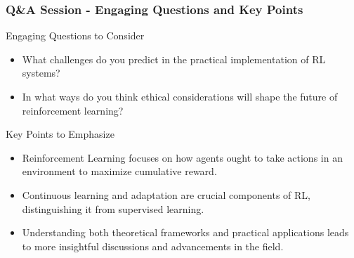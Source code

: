 \documentclass[aspectratio=169]{beamer}
\begin{document}
\begin{frame}[fragile]
    \frametitle{Q\&A Session - Engaging Questions and Key Points}
    \begin{block}{Engaging Questions to Consider}
        \begin{itemize}
            \item What challenges do you predict in the practical implementation of RL systems?
            \item In what ways do you think ethical considerations will shape the future of reinforcement learning?
        \end{itemize}
    \end{block}

    \begin{block}{Key Points to Emphasize}
        \begin{itemize}
            \item Reinforcement Learning focuses on how agents ought to take actions in an environment to maximize cumulative reward.
            \item Continuous learning and adaptation are crucial components of RL, distinguishing it from supervised learning.
            \item Understanding both theoretical frameworks and practical applications leads to more insightful discussions and advancements in the field.
        \end{itemize}
    \end{block}
\end{frame}
\end{document}
